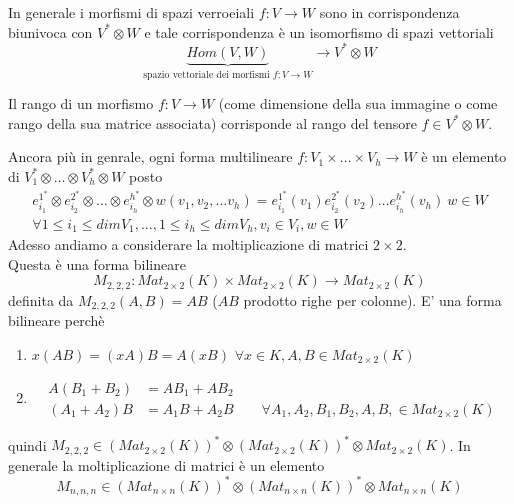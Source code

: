 \documentclass[../main.tex]{subfiles}
\begin{document}
In generale i morfismi di spazi verroeiali $f: V \rightarrow W$ sono in corrispondenza biunivoca con $V^* \otimes W$ e tale corrispondenza è un isomorfismo di spazi vettoriali
\begin{equation*}
    \underbrace{Hom(V, W)}_{\text{spazio vettoriale dei morfismi $f: V \rightarrow W$}} \rightarrow V^* \otimes W
\end{equation*}

Il rango di un morfismo $f: V \rightarrow W$ (come dimensione della sua immagine o come rango della sua matrice associata) corrisponde al rango del tensore $f \in V^* \otimes W$.

Ancora più in genrale, ogni forma multilineare $f: V_1 \times \ldots \times V_h \rightarrow W$ è un elemento di $V_1^* \otimes \ldots \otimes V_h^* \otimes W$ posto
\begin{gather*}
    e_{i_1}^{1^*} \otimes e_{i_2}^{2^*} \otimes \ldots \otimes e_{i_h}^{h^*} \otimes w (v_1, v_2, \ldots v_h) = e_{i_1}^{1^*}(v_1)e_{i_2}^{2^*}(v_2) \ldots e_{i_h}^{h^*}(v_h) \: w \in W\\
    \forall 1 \leq i_1 \leq dim V_1, \ldots, 1 \leq i_h \leq dim V_h, v_i \in V_i, w \in W
\end{gather*}
Adesso andiamo a considerare la moltiplicazione di matrici $2 \times 2$.\\
Questa è una forma bilineare
\begin{equation*}
    M_{2,2,2} : Mat_{2 \times 2} (K) \times Mat_{2 \times 2} (K) \rightarrow Mat_{2 \times 2} (K)
\end{equation*}
definita da $M_{2,2,2}(A,B)= AB$ ($AB$ prodotto righe per colonne). E' una forma bilineare perchè
\begin{enumerate}
    \item $x(AB) = (xA)B = A(xB)$ $\forall x \in K, A,B \in Mat_{2 \times 2} (K)$
    \item  \begin{align*}
              A(B_1 + B_2) & = AB_1 + AB_2                                                                   \\
              (A_1 + A_2)B & = A_1B + A_2B \qquad \forall A_1, A_2, B_1, B_2, A, B, \in Mat_{2 \times 2} (K)
          \end{align*}
\end{enumerate}
quindi $M_{2,2,2} \in (Mat_{2 \times 2} (K))^* \otimes (Mat_{2 \times 2} (K))^* \otimes Mat_{2 \times 2} (K)$. In generale la moltiplicazione di matrici è un elemento
\begin{equation*}
    M_{n,n,n} \in (Mat_{n \times n} (K))^* \otimes (Mat_{n \times n} (K))^* \otimes Mat_{n \times n} (K)
\end{equation*}
\end{document}
